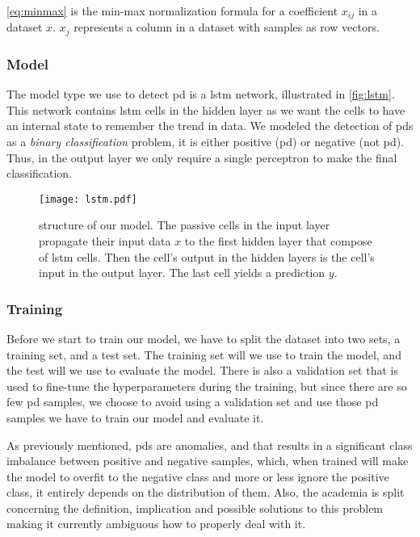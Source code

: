 \autoref{eq:minmax} is the min-max normalization formula for a coefficient $x_{ij}$ in a dataset $x$. $x_j$ represents a column in a dataset with samples as row vectors.

\subsubsection{Model}
The model type we use to detect \ac{pd} is a \ac{lstm} network, illustrated in \autoref{fig:lstm}. This network contains \ac{lstm} cells in the hidden layer as we want the cells to have an internal state to remember the trend in data. We modeled the detection of \acp{pd} as a \emph{binary classification} problem, it is either positive (\ac{pd}) or negative (not \ac{pd}). Thus, in the output layer we only require a single perceptron to make the final classification.

\begin{figure}[ht]
    \centering
    \texttt{[image: lstm.pdf]}
    \caption[\project's deep learning model]{structure of our model. The passive cells in the input layer propagate their input data $x$ to the first hidden layer that compose of \ac{lstm} cells. Then the cell's output in the hidden layers is the cell's input in the output layer. The last cell yields a prediction $y$.}
    \label{fig:lstm}
\end{figure}

\subsubsection{Training}
Before we start to train our model, we have to split the dataset into two sets, a training set, and a test set. The training set will we use to train the model, and the test will we use to evaluate the model. There is also a validation set that is used to fine-tune the hyperparameters during the training, but since there are so few \ac{pd} samples, we choose to avoid using a validation set and use those \ac{pd} samples we have to train our model and evaluate it.

As previously mentioned, \acp{pd} are anomalies, and that results in a significant class imbalance between positive and negative samples, which, when trained will make the model to overfit to the negative class and more or less ignore the positive class, it entirely depends on the distribution of them. Also, the academia is split concerning the definition, implication and possible solutions to this problem~\cite{tw_imbalance_2} making it currently ambiguous how to properly deal with it.

